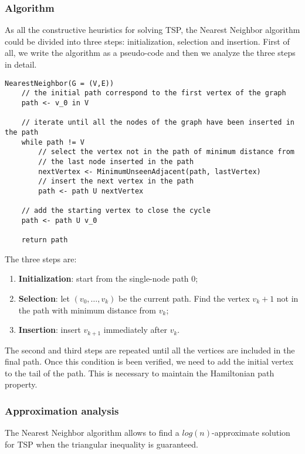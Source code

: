 \subsubsection{Algorithm}
As all the constructive heuristics for solving TSP, the Nearest Neighbor algorithm could be divided into three steps: initialization, selection and insertion. First of all, we write the algorithm as a pseudo-code and then we analyze the three steps in detail.

\begin{verbatim}
NearestNeighbor(G = (V,E))
    // the initial path correspond to the first vertex of the graph
    path <- v_0 in V
    
    // iterate until all the nodes of the graph have been inserted in the path
    while path != V
        // select the vertex not in the path of minimum distance from 
        // the last node inserted in the path
        nextVertex <- MinimumUnseenAdjacent(path, lastVertex)
        // insert the next vertex in the path
        path <- path U nextVertex
    
    // add the starting vertex to close the cycle
    path <- path U v_0
    
    return path
\end{verbatim}
\noindent
The three steps are:
\begin{enumerate}
    \item \textbf{Initialization}: start from the single-node path 0;
    \item \textbf{Selection}: let $(v_0, \dots, v_k)$ be the current path. Find the vertex $v_k+1$ not in the path with minimum distance from $v_k$;
    \item \textbf{Insertion}: insert $v_{k+1}$ immediately after $v_k$.
\end{enumerate}
The second and third steps are repeated until all the vertices are included in the final path. Once this condition is been verified, we need to add the initial vertex to the tail of the path. This is necessary to maintain the Hamiltonian path property.

\subsubsection{Approximation analysis}
The Nearest Neighbor algorithm allows to find a $log(n)$-approximate solution for TSP when the triangular inequality is guaranteed.

